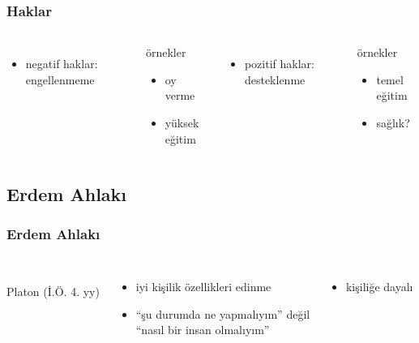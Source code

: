 \documentclass[dvipsnames]{beamer}
\theoremstyle{plain}
\begin{document}
\begin{frame}
  \frametitle{Haklar}

  \begin{columns}
    \begin{itemize}
      \item \alert{negatif} haklar: engellenmeme
    \end{itemize}
    \begin{exampleblock}{örnekler}
      \begin{itemize}
        \item oy verme
        \item yüksek eğitim
      \end{itemize}
    \end{exampleblock}

    \pause
    \begin{itemize}
      \item \alert{pozitif} haklar: desteklenme
    \end{itemize}
    \begin{exampleblock}{örnekler}
      \begin{itemize}
        \item temel eğitim
        \item sağlık?
      \end{itemize}
    \end{exampleblock}
  \end{columns}
\end{frame}

\subsection{Erdem Ahlakı}

\begin{frame}
  \frametitle{Erdem Ahlakı}

  \begin{columns}
    \begin{center}
      \\
      Platon (İ.Ö. 4. yy)
    \end{center}

    \pause
    \begin{itemize}
      \item iyi kişilik özellikleri edinme

      \item ``şu durumda ne yapmalıyım'' değil\\
        ``nasıl bir insan olmalıyım''
    \end{itemize}

    \begin{itemize}
      \item kişiliğe dayalı
    \end{itemize}
  \end{columns}
\end{frame}
\end{document}
